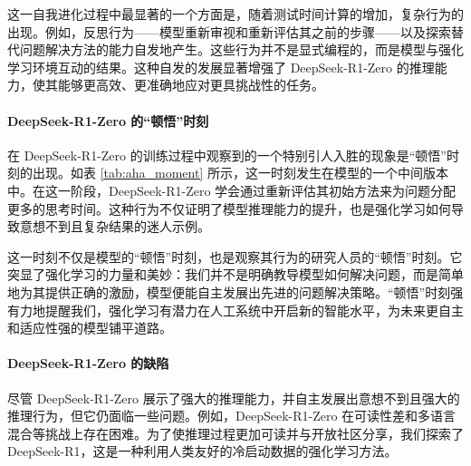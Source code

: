 \documentclass[lang=cn,a4paper,newtx]{elegantpaper}
\newcommand{\dsri}{DeepSeek-R1}
\newcommand{\dsro}{DeepSeek-R1-Zero}
\begin{document}
这一自我进化过程中最显著的一个方面是，随着测试时间计算的增加，复杂行为的出现。例如，反思行为——模型重新审视和重新评估其之前的步骤——以及探索替代问题解决方法的能力自发地产生。这些行为并不是显式编程的，而是模型与强化学习环境互动的结果。这种自发的发展显著增强了 \dsro{} 的推理能力，使其能够更高效、更准确地应对更具挑战性的任务。

\paragraph{\dsro{} 的“顿悟”时刻}

在 \dsro{} 的训练过程中观察到的一个特别引人入胜的现象是“顿悟”时刻的出现。如表 \ref{tab:aha_moment} 所示，这一时刻发生在模型的一个中间版本中。在这一阶段，\dsro{} 学会通过重新评估其初始方法来为问题分配更多的思考时间。这种行为不仅证明了模型推理能力的提升，也是强化学习如何导致意想不到且复杂结果的迷人示例。

这一时刻不仅是模型的“顿悟”时刻，也是观察其行为的研究人员的“顿悟”时刻。它突显了强化学习的力量和美妙：我们并不是明确教导模型如何解决问题，而是简单地为其提供正确的激励，模型便能自主发展出先进的问题解决策略。“顿悟”时刻强有力地提醒我们，强化学习有潜力在人工系统中开启新的智能水平，为未来更自主和适应性强的模型铺平道路。

\paragraph{\dsro{} 的缺陷}

尽管 \dsro{} 展示了强大的推理能力，并自主发展出意想不到且强大的推理行为，但它仍面临一些问题。例如，\dsro{} 在可读性差和多语言混合等挑战上存在困难。为了使推理过程更加可读并与开放社区分享，我们探索了 \dsri{}，这是一种利用人类友好的冷启动数据的强化学习方法。
\end{document}

